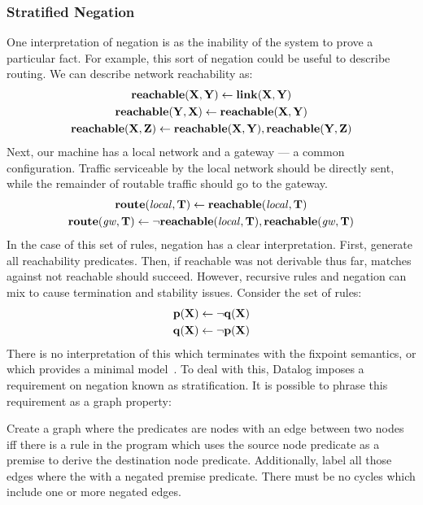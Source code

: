 \subsubsection{Stratified Negation}
One interpretation of negation is as the inability of the system to prove a particular fact.
For example, this sort of negation could be useful to describe routing.
We can describe network reachability as:
\begin{gather*}
        {\bf reachable}({\bf X}, {\bf Y}) \leftarrow {\bf link}({\bf X}, {\bf Y})\\
        {\bf reachable}({\bf Y}, {\bf X}) \leftarrow {\bf reachable}({\bf X}, {\bf Y})\\
        {\bf reachable}({\bf X}, {\bf Z}) \leftarrow {\bf reachable}({\bf X}, {\bf Y}), {\bf reachable}({\bf Y}, {\bf Z})
\end{gather*}
Next, our machine has a local network and a gateway --- a common configuration.
Traffic serviceable by the local network should be directly sent, while the remainder of routable traffic should go to the gateway.
\begin{gather*}
        {\bf route}({\it local}, {\bf T}) \leftarrow {\bf reachable}({\it local}, {\bf T})\\
        {\bf route}({\it gw}, {\bf T}) \leftarrow \neg {\bf reachable}({\it local}, {\bf T}), {\bf reachable}({\it gw}, {\bf T})
\end{gather*}
In the case of this set of rules, negation has a clear interpretation.
First, generate all reachability predicates.
Then, if reachable was not derivable thus far, matches against not reachable should succeed.
However, recursive rules and negation can mix to cause termination and stability issues.
Consider the set of rules:
\begin{gather*}
        {\bf p}({\bf X}) \leftarrow \neg {\bf q}({\bf X})\\
        {\bf q}({\bf X}) \leftarrow \neg {\bf p}({\bf X})
\end{gather*}
There is no interpretation of this which terminates with the fixpoint semantics, or which provides a minimal model~\cite{prologbook}.
To deal with this, Datalog imposes a requirement on negation known as stratification.
It is possible to phrase this requirement as a graph property:

Create a graph where the predicates are nodes with an edge between two nodes iff there is a rule in the program which uses the source node predicate as a premise to derive the destination node predicate.
Additionally, label all those edges where the with a negated premise predicate.
There must be no cycles which include one or more negated edges.

